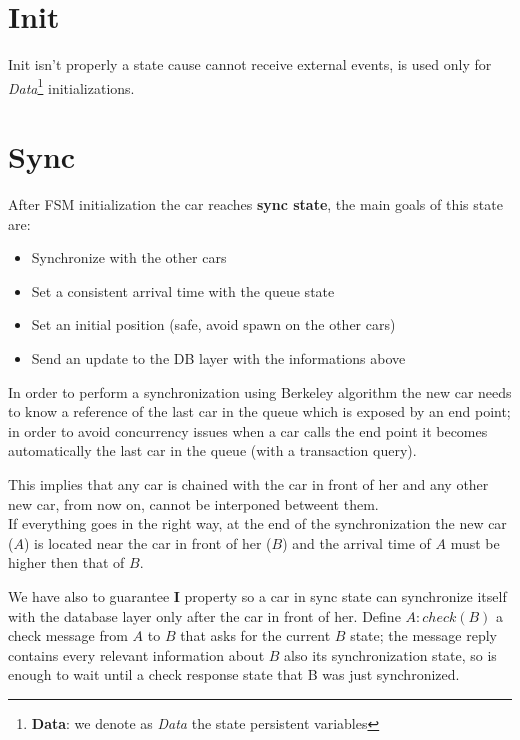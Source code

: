 \section{Init}

Init isn't properly a state cause cannot receive external events, 
is used only for 
\textit{Data}\footnote{\textbf{Data}: we denote as \textit{Data} 
the state persistent variables} 
initializations.


\section{Sync}

After FSM initialization the car reaches \textbf{sync state}, the main goals 
of this state are:

\begin{itemize}
    \item Synchronize with the other cars
    \item Set a consistent arrival time with the queue state 
    \item Set an initial position (safe, avoid spawn on the other cars)
    \item Send an update to the DB layer with the informations above
\end{itemize}

In order to perform a synchronization using Berkeley algorithm the new car needs to 
know a reference of the last car in the queue which is exposed by an end point; 
in order to avoid concurrency issues when a car calls the end point 
it becomes automatically the last car in the queue (with a transaction query).

This implies that any car is chained with the car in front of her and any other 
new car, from now on, cannot be interponed betweent them.\\

\noindent
If everything goes in the right way, at the end of the synchronization the new car ($A$) 
is located near the car in front of her ($B$) and the arrival time of $A$ must be 
higher then that of $B$.

We have also to guarantee \textbf{I} property so a car in sync state can synchronize 
itself with the database layer only after the car in front of her. Define 
$A:check(B)$ a check message from $A$ to $B$ that asks for the current $B$ state;
the message reply contains every relevant information about $B$ also its synchronization 
state, so is enough to wait until a check response state that B was just 
synchronized.  

